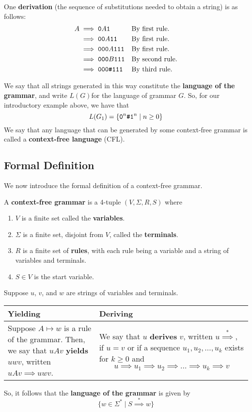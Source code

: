 \documentclass[letterpaper]{article}
\begin{document}
One \textbf{derivation} (the sequence of substitutions needed to obtain a string) is as follows:
\begin{equation*}
    \begin{aligned}
        A &\implies \texttt{0}A\texttt{1} && \text{By first rule.} \\ 
            &\implies \texttt{00}A\texttt{11} && \text{By first rule.} \\
            &\implies \texttt{000}A\texttt{111} && \text{By first rule.} \\
            &\implies \texttt{000}B\texttt{111} && \text{By second rule.} \\
            &\implies \texttt{000\#111} && \text{By third rule.} \\
    \end{aligned}
\end{equation*}

We say that all strings generated in this way constitute the \textbf{language of the grammar}, and write $L(G)$for the language of grammar $G$. So, for our introductory example above, we have that 
\[L(G_1) = \{\texttt{0}^n \texttt{\#} \texttt{1}^n \mid n \geq 0\}\]
We say that any language that can be generated by some context-free grammar is called a \textbf{context-free language} (CFL). 

\subsection{Formal Definition}
We now introduce the formal definition of a context-free grammar. 
\begin{definition}{}{}
    A \textbf{context-free grammar} is a 4-tuple $(V, \Sigma, R, S)$ where 
    \begin{enumerate}
        \item $V$ is a finite set called the \textbf{variables}.
        \item $\Sigma$ is a finite set, disjoint from $V$, called the \textbf{terminals}.
        \item $R$ is a finite set of \textbf{rules}, with each rule being a variable and a string of variables and terminals.
        \item $S \in V$ is the start variable. 
    \end{enumerate}
\end{definition}
Suppose $u$, $v$, and $w$ are strings of variables and terminals.
\begin{center}
    \begin{tabular}{p{3in}|p{3in}}
        \textbf{Yielding} & \textbf{Deriving} \\ 
        \hline 
        Suppose $A \mapsto w$ is a rule of the grammar. Then, we say that $uAv$ \textbf{yields} $uwv$, written $uAv \implies uwv$. &
        We say that $u$ \textbf{derives} $v$, written $u \stackrel{*}{\implies}$, if $u = v$ or if a sequence $u_1, u_2, \dots, u_k$ exists for $k \geq 0$ and 
        \[u \implies u_1 \implies u_2 \implies \dots \implies u_k \implies v\]
    \end{tabular}
\end{center}
So, it follows that the \textbf{language of the grammar} is given by 
\[\{w \in \Sigma^* \mid S \stackrel{*}{\implies} w\}\]
\end{document}
